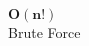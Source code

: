 \documentclass[preview]{standalone}
\begin{document}
\begin{center}
$\bm{O(n!)}$\\Brute Force
\end{center}
\end{document}
